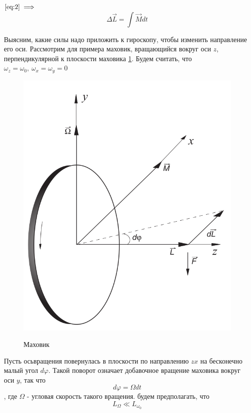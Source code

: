 \documentclass[a4paper,12pt]{article} %
\begin{document}
$\eqref{eq:2} \implies$
\begin {equation} \Delta \vec{L} = \int{\vec{M} dt}  \label{eq:4} \end{equation}

Выясним, какие силы надо приложить к гироскопу, чтобы изменить направление его оси. Рассмотрим для примера маховик, вращающийся вокруг оси $z$, перпендикулярной к плоскости маховика \ref{pic:1}.
Будем считать, что $\omega_z = \omega_0,\ \omega_x = \omega_y = 0$
\begin {figure} [h] \includegraphics[scale=0.3]{./125/рис 1.png} \label{pic:1} \caption[Рис. 1]{Маховик} \end{figure}

Пусть осьвращения повернулась в плоскости по направлению $zx$ на бесконечно малый угол $d\varphi$. Такой поворот означает добавочное вращение маховика вокруг оси $y$, так что \[d\varphi = \Omega dt\], где $\Omega$ - угловая скорость такого вращения. будем предполагать, что
\begin {equation} L_\Omega \ll L_{\omega_0} \label{eq:5} \end {equation}
\end{document}

